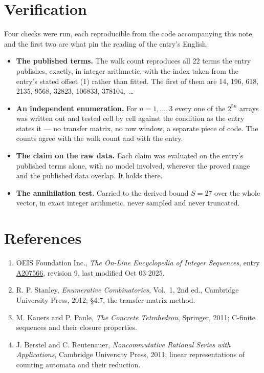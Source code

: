 \documentclass[11pt]{article}
\theoremstyle{definition}
\begin{document}
\section{Verification}

Four checks were run, each reproducible from the code accompanying this note, and the first two are what pin the reading of the entry's English.

\begin{itemize}

\item {\bfseries The published terms.} The walk count reproduces all 22 terms the entry publishes, exactly, in integer arithmetic, with the index taken from the entry's stated offset (1) rather than fitted. The first of them are 14, 196, 618, 2135, 9568, 32823, 106833, 378104,~\dots

\item {\bfseries An independent enumeration.} For $n = 1,\dots,3$ every one of the $2^{5n}$ arrays was written out and tested cell by cell against the condition as the entry states it --- no transfer matrix, no row window, a separate piece of code. The counts agree with the walk count and with the entry.

\item {\bfseries The claim on the raw data.} Each claim was evaluated on the entry's published terms alone, with no model involved, wherever the proved range and the published data overlap. It holds there.

\item {\bfseries The annihilation test.} Carried to the derived bound $S = 27$ over the whole vector, in exact integer arithmetic, never sampled and never truncated.

\end{itemize}

\section{References}

\begin{enumerate}

\item OEIS Foundation Inc., \emph{The On-Line Encyclopedia of Integer Sequences}, entry \href{https://oeis.org/A207566}{A207566}, revision 9, last modified Oct 03 2025.

\item R. P. Stanley, \emph{Enumerative Combinatorics}, Vol.~1, 2nd ed., Cambridge University Press, 2012; \S4.7, the transfer-matrix method.

\item M. Kauers and P. Paule, \emph{The Concrete Tetrahedron}, Springer, 2011; C-finite sequences and their closure properties.

\item J. Berstel and C. Reutenauer, \emph{Noncommutative Rational Series with Applications}, Cambridge University Press, 2011; linear representations of counting automata and their reduction.

\end{enumerate}
\end{document}
